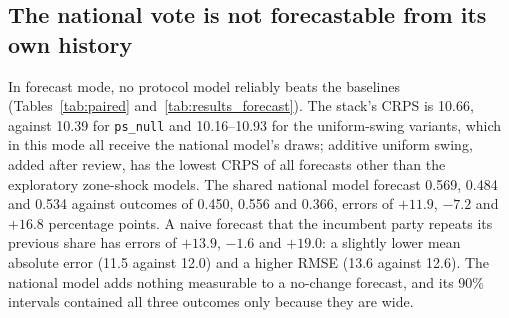 \documentclass[preprint,12pt,authoryear]{elsarticle}
\begin{document}
\subsection{The national vote is not forecastable from its own history}
\label{sec:national}
In forecast mode, no protocol model reliably beats the baselines (Tables~\ref{tab:paired} and~\ref{tab:results_forecast}). The stack's CRPS is 10.66, against 10.39 for \texttt{ps\_null} and 10.16--10.93 for the uniform-swing variants, which in this mode all receive the national model's draws; additive uniform swing, added after review, has the lowest CRPS of all forecasts other than the exploratory zone-shock models. The shared national model forecast 0.569, 0.484 and 0.534 against outcomes of 0.450, 0.556 and 0.366, errors of $+11.9$, $-7.2$ and $+16.8$ percentage points. A naive forecast that the incumbent party repeats its previous share has errors of $+13.9$, $-1.6$ and $+19.0$: a slightly lower mean absolute error (11.5 against 12.0) and a higher RMSE (13.6 against 12.6). The national model adds nothing measurable to a no-change forecast, and its 90\% intervals contained all three outcomes only because they are wide.
\end{document}
